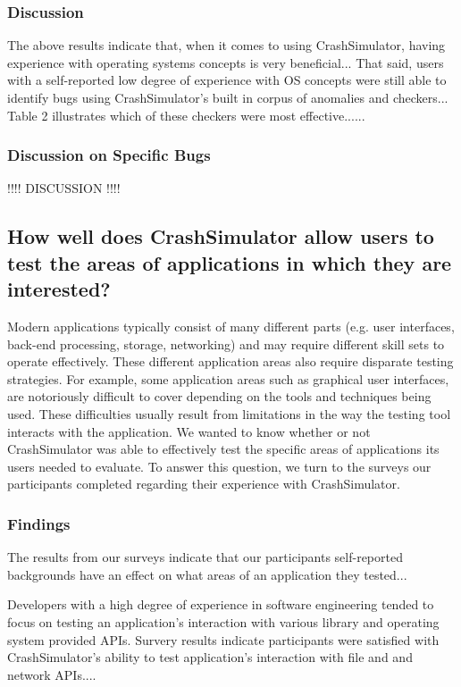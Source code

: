 \subsubsection{Discussion}

The above results indicate that, when it comes to using CrashSimulator,
having experience with operating systems concepts is very beneficial...
That said, users with a self-reported low degree of experience with OS
concepts were still able to identify bugs using CrashSimulator's built in
corpus of anomalies and checkers...
Table 2 illustrates which of these checkers were most effective......


\subsubsection{Discussion on Specific Bugs}

!!!! DISCUSSION !!!!


\subsection{How well does CrashSimulator allow users to test the areas of
applications in which they are interested?}

Modern applications typically consist of many different parts (e.g. user
interfaces,  back-end processing, storage, networking) and may require
different skill sets to operate effectively.  These different application
areas also
require disparate testing strategies.  For example, some application
areas such as graphical user interfaces, are notoriously difficult to cover
depending on the tools and techniques being used.  These difficulties
usually result from limitations in the way the testing tool interacts with
the application. We wanted to know whether or not
CrashSimulator was able to effectively test the specific areas of
applications its
users needed to evaluate.  To answer this question, we turn to the
surveys our participants completed regarding their experience with
CrashSimulator.


\subsubsection{Findings}

The results from our surveys indicate that our participants self-reported
backgrounds have an effect on what areas of an application they tested...

Developers with a high degree of experience in software engineering tended
to focus on testing an application's interaction with various library and
operating system provided APIs.  Survery results indicate participants were
satisfied with CrashSimulator's ability to test application's interaction
with file and and network APIs....

